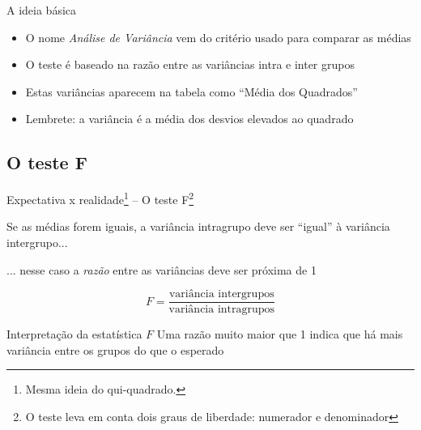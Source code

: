 \documentclass{beamer}
\begin{document}
\begin{frame}{A ideia básica}
  \begin{itemize}
    \footnotesize
  \item O nome {\em Análise de Variância} vem do critério usado para comparar as médias
    \bigskip
    \bigskip
  \item O teste é baseado na razão entre as variâncias intra e inter grupos
  \item Estas variâncias aparecem na tabela como ``Média dos Quadrados''
    \bigskip
    \bigskip
  \item Lembrete: a variância é a média dos desvios elevados ao quadrado
  \end{itemize}
\end{frame}

\subsection{O teste F}

\begin{frame}{Expectativa x realidade\footnote{\scriptsize Mesma ideia do qui-quadrado.} -- O teste F\footnote{\scriptsize O teste leva em conta dois graus de liberdade: numerador e denominador}}
  \begin{block}{}
    \small
    Se as médias forem iguais, a variância intragrupo deve ser ``igual'' à variância intergrupo...

    \bigskip
    ... nesse caso a {\em razão} entre as variâncias deve ser próxima de 1
  \end{block}

  $$F = \frac{\text{variância intergrupos}}{\text{variância intragrupos}}$$

  \begin{block}{Interpretação da estatística $F$}
    Uma razão muito maior que 1 indica que há mais variância entre os grupos do que o esperado
  \end{block}
\end{frame}
\end{document}
